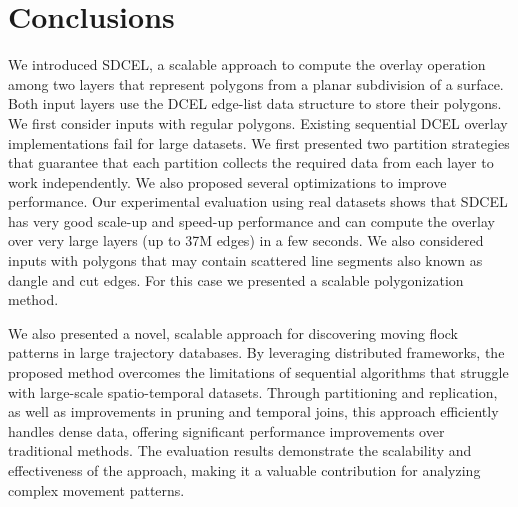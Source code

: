 \chapter{Conclusions}

We introduced SDCEL, a scalable approach to compute the overlay operation among two layers that represent polygons from a planar subdivision of a surface. 
Both input layers use the DCEL edge-list data structure to store their polygons. 
We first consider inputs with regular polygons. Existing sequential DCEL overlay implementations fail for large datasets. We first presented two partition strategies that guarantee that each partition collects the required data from each layer to work independently. 
We also proposed several optimizations to improve performance. Our experimental evaluation using real datasets shows that SDCEL has very good scale-up and speed-up performance and can compute the overlay over very large layers (up to 37M edges) in a few seconds. 
We also considered inputs with polygons that may contain scattered line segments also known as dangle and cut edges. For this case we presented a scalable polygonization method. 

We also presented a novel, scalable approach for discovering moving flock patterns in large trajectory databases. By leveraging distributed frameworks, the proposed method overcomes the limitations of sequential algorithms that struggle with large-scale spatio-temporal datasets. Through partitioning and replication, as well as improvements in pruning and temporal joins, this approach efficiently handles dense data, offering significant performance improvements over traditional methods. The evaluation results demonstrate the scalability and effectiveness of the approach, making it a valuable contribution for analyzing complex movement patterns.

